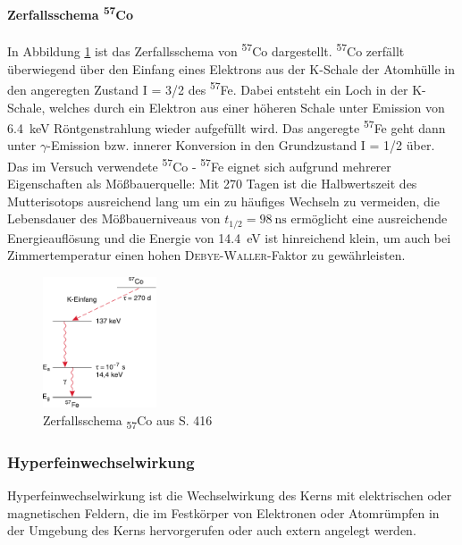 \documentclass[a4paper,twoside,final]{article}
\begin{document}
\paragraph{Zerfallsschema \textsuperscript{57}Co}
In Abbildung \ref{fig:Zerfallsschema} ist das Zerfallsschema von \textsuperscript{57}Co dargestellt. \textsuperscript{57}Co zerfällt überwiegend über den Einfang eines Elektrons aus der K-Schale der Atomhülle in den angeregten Zustand I = 3/2 des \textsuperscript{57}Fe. Dabei entsteht ein Loch in der K-Schale, welches durch ein Elektron aus einer höheren Schale unter Emission von \SI{6,4}{\keV} Röntgenstrahlung wieder aufgefüllt wird. Das angeregte \textsuperscript{57}Fe geht dann unter $\gamma$-Emission bzw. innerer Konversion in den Grundzustand I = 1/2 über.\\
Das im Versuch verwendete \textsuperscript{57}Co - \textsuperscript{57}Fe eignet sich aufgrund mehrerer Eigenschaften als Mößbauerquelle: Mit 270 Tagen ist die Halbwertszeit des Mutterisotops ausreichend lang um ein zu häufiges Wechseln zu vermeiden, die Lebensdauer des Mößbauerniveaus von $t_{1/2}=\SI{98}{\nano\second}$ ermöglicht eine ausreichende Energieauflösung und die Energie von \SI{14,4}{\electronvolt} ist hinreichend klein, um auch bei Zimmertemperatur einen hohen \textsc{Debye}-\textsc{Waller}-Faktor zu gewährleisten.
\begin{figure}[htp]
    \centering
    \includegraphics[width=0.3\textwidth]{Bilder/Zerfallsschema_Kobalt.pdf}
    \caption{Zerfallsschema \textsubscript{57}Co aus \cite{Demtroeder} S. 416}
    \label{fig:Zerfallsschema}
\end{figure}


\subsubsection{Hyperfeinwechselwirkung}
Hyperfeinwechselwirkung ist die Wechselwirkung des Kerns mit elektrischen oder magnetischen Feldern, die im Festkörper von Elektronen oder Atomrümpfen in der Umgebung des Kerns hervorgerufen oder auch extern angelegt werden.
\end{document}
